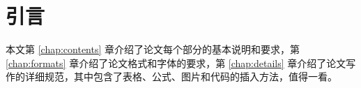 \chapter{引言}
\label{chap:references}
\par 本文第 \ref{chap:contents} 章介绍了论文每个部分的基本说明和要求，第 \ref{chap:formats} 章介绍了论文格式和字体的要求，第 \ref{chap:details} 章介绍了论文写作的详细规范，其中包含了表格、公式、图片和代码的插入方法，值得一看。